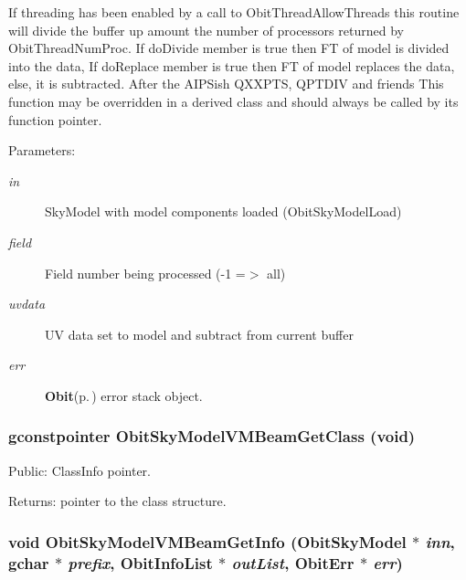 If threading has been enabled by a call to Obit\-Thread\-Allow\-Threads this routine will divide the buffer up amount the number of processors returned by Obit\-Thread\-Num\-Proc. If do\-Divide member is true then FT of model is divided into the data, If do\-Replace member is true then FT of model replaces the data, else, it is subtracted. After the AIPSish QXXPTS, QPTDIV and friends This function may be overridden in a derived class and should always be called by its function pointer. \begin{Desc}
\item[Parameters:]
\begin{description}
\item[{\em in}]Sky\-Model with model components loaded (Obit\-Sky\-Model\-Load) \item[{\em field}]Field number being processed (-1 =$>$ all) \item[{\em uvdata}]UV data set to model and subtract from current buffer \item[{\em err}]{\bf Obit}{\rm (p.\,\pageref{structObit})} error stack object. \end{description}
\end{Desc}
\subsubsection{\setlength{\rightskip}{0pt plus 5cm}gconstpointer Obit\-Sky\-Model\-VMBeam\-Get\-Class (void)}\label{ObitSkyModelVMBeam_8c_a13}


Public: Class\-Info pointer. 

\begin{Desc}
\item[Returns:]pointer to the class structure. \end{Desc}
\subsubsection{\setlength{\rightskip}{0pt plus 5cm}void Obit\-Sky\-Model\-VMBeam\-Get\-Info ({\bf Obit\-Sky\-Model} $\ast$ {\em inn}, gchar $\ast$ {\em prefix}, {\bf Obit\-Info\-List} $\ast$ {\em out\-List}, {\bf Obit\-Err} $\ast$ {\em err})}\label{ObitSkyModelVMBeam_8c_a20}


